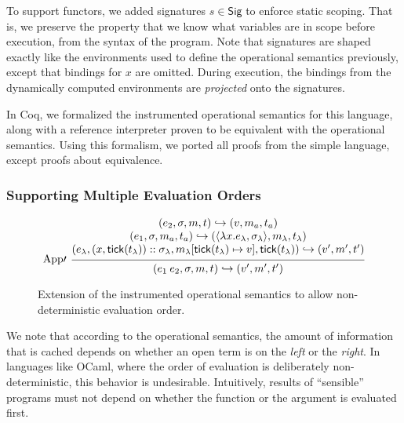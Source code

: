 \documentclass[acmsmall,screen,review]{acmart}\settopmatter{printfolios=true,printccs=false,printacmref=false}
\theoremstyle{acmdefinition}
\newcommand*{\cons}{::}
\newcommand*{\ctx}{\sigma}
\newcommand*{\Sig}{\mathsf{Sig}}
\newcommand*{\mem}{m}
\newcommand*{\semarrow}{\hookrightarrow}
\newcommand*{\tick}{\mathsf{tick}}
\begin{document}
To support functors, we added signatures $s\in\Sig$ to enforce static scoping.
That is, we preserve the property that we know what variables are in scope before execution, from the syntax of the program.
Note that signatures are shaped exactly like the environments used to define the operational semantics previously, except that bindings for $x$ are omitted.
During execution, the bindings from the dynamically computed environments are \emph{projected} onto the signatures.

In Coq, we formalized the instrumented operational semantics for this language, along with a reference interpreter proven to be equivalent with the operational semantics.
Using this formalism, we ported all proofs from the simple language, except proofs about equivalence.

\subsubsection{Supporting Multiple Evaluation Orders}
\begin{figure}[h!]
  \scriptsize
  \begin{flushright}
    \fbox{$(e,\ctx,\mem,t)\semarrow(V,\mem',t')\text{ or }(e',\ctx',\mem',t')$}
  \end{flushright}
  \[
    \begin{prooftree}
      \hypo{
        \begin{matrix}
          (e_{2}, \ctx, \mem, t)
          \semarrow
          (v, \mem_{a}, t_{a})                                                               \\
          (e_{1}, \ctx, \mem_{a}, t_{a})
          \semarrow
          (\langle\lambda x.e_{\lambda}, \ctx_{\lambda}\rangle, \mem_{\lambda}, t_{\lambda}) \\
          (e_{\lambda}, (x, \tick(t_{\lambda}))\cons \ctx_{\lambda}, \mem_{\lambda}[\tick(t_{\lambda})\mapsto v], \tick(t_{\lambda}))
          \semarrow
          (v', \mem',t')
        \end{matrix}
      }
      \infer[left label={App$\prime$}]1{
      (e_{1}\:e_{2}, \ctx, \mem, t)
      \semarrow
      (v', \mem',t')
      }
    \end{prooftree}
  \]
  \caption{Extension of the instrumented operational semantics to allow non-deterministic evaluation order.}
  \label{fig:cbvorder}
\end{figure}
We note that according to the operational semantics, the amount of information that is cached depends on whether an open term is on the \emph{left} or the \emph{right}.
In languages like OCaml, where the order of evaluation is deliberately non-deterministic, this behavior is undesirable.
Intuitively, results of ``sensible'' programs must not depend on whether the function or the argument is evaluated first.
\end{document}
